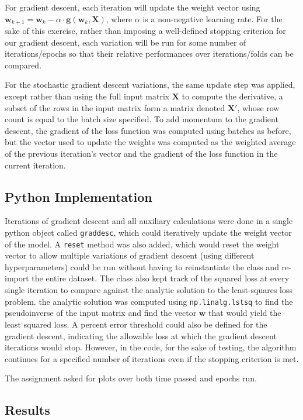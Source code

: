 \documentclass{article}
\begin{document}
For gradient descent, each iteration will update the weight vector using $\mathbf{w}_{k+1} = \mathbf{w}_{k} - \alpha \cdot \mathbf{g}(\mathbf{w}_{k}, \mathbf{X})$, where $\alpha$ is a non-negative learning rate. For the sake of this exercise, rather than imposing a well-defined stopping criterion for our gradient descent, each variation will be run for some number of iterations/epochs so that their relative performances over iterations/folds can be compared.

For the stochastic gradient descent variations, the same update step was applied, except rather than using the full input matrix $\mathbf{X}$ to compute the derivative, a subset of the rows in the input matrix form a matrix denoted $\mathbf{X'}$, whose row count is equal to the batch size specified. To add momentum to the gradient descent, the gradient of the loss function was computed using batches as before, but the vector used to update the weights was computed as the weighted average of the previous iteration's vector and the gradient of the loss function in the current iteration.

\subsection{Python Implementation}
Iterations of gradient descent and all auxiliary calculations were done in a single python object called \verb+graddesc+, which could iteratively update the weight vector of the model. A \verb+reset+ method was also added, which would reset the weight vector to allow multiple variations of gradient descent (using different hyperparameters) could be run without having to reinstantiate the class and re-import the entire dataset. The class also kept track of the squared loss at every single iteration to compare against the analytic solution to the least-squares loss problem. the analytic solution was computed using \verb+np.linalg.lstsq+ to find the pseudoinverse of the input matrix and find the vector $\mathbf{w}$ that would yield the least squared loss. A percent error threshold could also be defined for the gradient descent, indicating the allowable loss at which the gradient descent iterations would stop. However, in the code, for the sake of testing, the algorithm continues for a specified number of iterations even if the stopping criterion is met.

The assignment asked for plots over both time passed and epochs run.

\subsection{Results}
\end{document}

